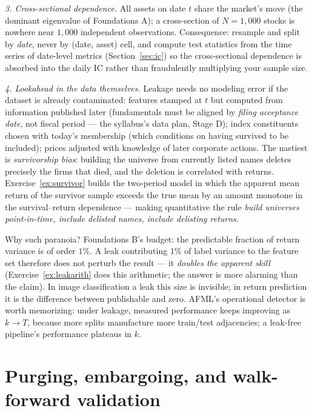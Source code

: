 \documentclass[11pt]{article}
\numberwithin{equation}{section}
\theoremstyle{plain}
\theoremstyle{definition}
\theoremstyle{remark}
\begin{document}
\emph{3. Cross-sectional dependence.} All assets on date $t$ share the market's move (the dominant eigenvalue of Foundations A); a cross-section of $N = 1{,}000$ stocks is nowhere near $1{,}000$ independent observations. Consequence: resample and split by \emph{date}, never by (date, asset) cell, and compute test statistics from the time series of date-level metrics (Section~\ref{sec:ic}) so the cross-sectional dependence is absorbed into the daily IC rather than fraudulently multiplying your sample size.

\emph{4. Lookahead in the data themselves.} Leakage needs no modeling error if the dataset is already contaminated: features stamped at $t$ but computed from information published later (fundamentals must be aligned by \emph{filing acceptance date}, not fiscal period --- the syllabus's data plan, Stage D); index constituents chosen with today's membership (which conditions on having survived to be included); prices adjusted with knowledge of later corporate actions. The nastiest is \emph{survivorship bias}: building the universe from currently listed names deletes precisely the firms that died, and the deletion is correlated with returns. Exercise~\ref{ex:survivor} builds the two-period model in which the apparent mean return of the survivor sample exceeds the true mean by an amount monotone in the survival--return dependence --- making quantitative the rule \emph{build universes point-in-time, include delisted names, include delisting returns}.

\begin{finbox}
Why such paranoia? Foundations B's budget: the predictable fraction of return variance is of order $1\%$. A leak contributing $1\%$ of label variance to the feature set therefore does not perturb the result --- it \emph{doubles the apparent skill} (Exercise~\ref{ex:leakarith} does this arithmetic; the answer is more alarming than the claim). In image classification a leak this size is invisible; in return prediction it is the difference between publishable and zero. AFML's operational detector is worth memorizing: under leakage, measured performance keeps improving as $k \to T$, because more splits manufacture more train/test adjacencies; a leak-free pipeline's performance plateaus in $k$.
\end{finbox}

\section{Purging, embargoing, and walk-forward validation}\label{sec:purge}
\end{document}
